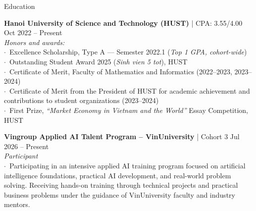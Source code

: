 \documentclass[
a4paper,
12pt,
]{resume}
\begin{document}
    \begin{rSection}{Education}
        
        \textbf{Hanoi University of Science and Technology (HUST)} 
        \;|\; CPA: 3.55/4.00 \hfill {Oct 2022 -- Present} \\
        \textit{Honors and awards:} \\
        $\cdot$\ Excellence Scholarship, Type A --- Semester 2022.1 (\textit{Top 1 GPA, cohort-wide}) \\
        $\cdot$\ Outstanding Student Award 2025 (\textit{Sinh vien 5 tot}), HUST \\
        $\cdot$\ Certificate of Merit, Faculty of Mathematics and Informatics (2022--2023, 2023--2024) \\
        $\cdot$\ Certificate of Merit from the President of HUST for academic achievement and \\
        \hspace*{1em} contributions to student organizations (2023--2024) \\
        $\cdot$\ First Prize, \textit{``Market Economy in Vietnam and the World''} Essay Competition, HUST
        
        \medskip
        
        \textbf{Vingroup Applied AI Talent Program -- VinUniversity} \;|\; Cohort 3 \hfill {Jul 2026 -- Present} \\
        \textit{Participant} \\
        $\cdot$\ Participating in an intensive applied AI training program focused on 
        artificial intelligence foundations, practical AI development, and real-world 
        problem solving. Receiving hands-on training through technical projects and practical 
        business problems under the guidance of VinUniversity faculty and industry mentors.
%        
%        
        
    \end{rSection}
    
    
\end{document}
